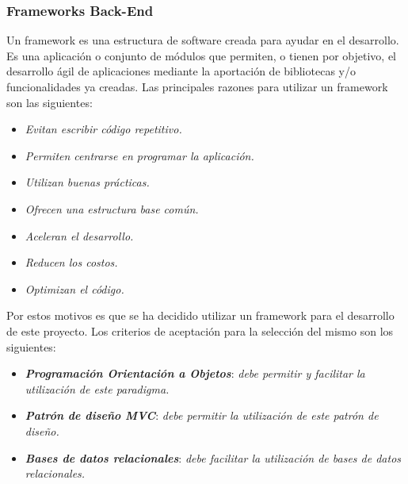 \documentclass[11pt,oneside]{book}
\begin{document}
\subsubsection{Frameworks Back-End}
Un framework es una estructura de software creada para ayudar en el desarrollo. Es una aplicación o conjunto de módulos que permiten, o tienen por objetivo, el desarrollo ágil de aplicaciones mediante la aportación de bibliotecas y/o funcionalidades ya creadas. Las principales razones para utilizar un framework son las siguientes:
\begin{itemize}
\item \textit{Evitan escribir código repetitivo.}
\item \textit{Permiten centrarse en programar la aplicación.}
\item \textit{Utilizan buenas prácticas.}
\item \textit{Ofrecen una estructura base común.}
\item \textit{Aceleran el desarrollo.}
\item \textit{Reducen los costos.}
\item \textit{Optimizan el código.}
\end{itemize}

Por estos motivos es que se ha decidido utilizar un framework para el desarrollo de este proyecto. Los criterios de aceptación para la selección del mismo son los siguientes:
\begin{itemize}
\item \textit{\textbf{Programación Orientación a Objetos}}: \textit{debe permitir y facilitar la utilización de este paradigma.}

\item \textit{\textbf{Patrón de diseño MVC}}: \textit{debe permitir la utilización de este patrón de diseño.}

\item \textit{\textbf{Bases de datos relacionales}}: \textit{debe facilitar la utilización de bases de datos relacionales.}
\end{itemize}
\end{document}
